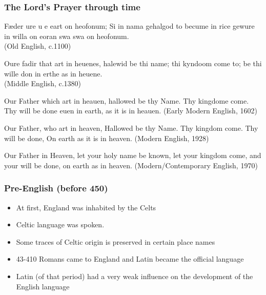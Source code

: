\documentclass[12pt, table]{beamer}
\begin{document}
\begin{frame}
\frametitle{The Lord's Prayer through time}
\begin{itemize}
\item \footnotesize{F\ae der ure \thorn u \thorn  e eart on heofonum; Si \thorn in nama gehalgod to becume \thorn in rice gewur\thorn e \dh in willa on eor\dh an swa swa on heofonum.\\(Old English, c.1100)
\item Oure fadir that art in heuenes, halewid be thi name; thi kyndoom come to; be thi wille don in erthe as in heuene.\\(Middle English, c.1380)
\item Our Father which art in heauen, hallowed be thy Name. Thy kingdome come. Thy will be done euen in earth, as it is in heauen. (Early Modern English, 1602)
\item Our Father, who art in heaven, Hallowed be thy Name. Thy kingdom come. Thy will be done, On earth as it is in heaven. (Modern English, 1928)
\item Our Father in Heaven, let your holy name be known, let your kingdom come, and your will be done, on earth as in heaven. (Modern/Contemporary English, 1970)}
\end{itemize}
\end{frame}

\begin{frame}
\frametitle{Pre-English (before 450)}
\begin{itemize}
\item At first, England was inhabited by the Celts 
\item Celtic language was spoken.
\item Some traces of Celtic origin is preserved in certain place names 
\item 43-410 Romans came to England and Latin became the official language
\item Latin (of that period) had a very weak influence on the development of the English language
\end{itemize}
\end{frame}
\end{document}
